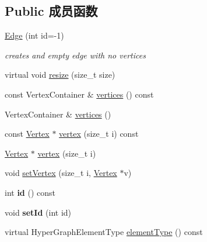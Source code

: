\subsection*{Public 成员函数}
\begin{DoxyCompactItemize}
\item 
\hypertarget{classg2o_1_1HyperGraph_1_1Edge_a891618b34652837ef0bee7084db81f2e}{\hyperlink{classg2o_1_1HyperGraph_1_1Edge_a891618b34652837ef0bee7084db81f2e}{Edge} (int id=-\/1)}\label{classg2o_1_1HyperGraph_1_1Edge_a891618b34652837ef0bee7084db81f2e}

\begin{DoxyCompactList}\small\item\em creates and empty edge with no vertices \end{DoxyCompactList}\item 
virtual void \hyperlink{classg2o_1_1HyperGraph_1_1Edge_ad8913f1149a0fd5bb628f0f1c8a91a55}{resize} (size\-\_\-t size)
\item 
const Vertex\-Container \& \hyperlink{classg2o_1_1HyperGraph_1_1Edge_a6410bb70a917b5407770ef1f1090b5f5}{vertices} () const 
\item 
Vertex\-Container \& \hyperlink{classg2o_1_1HyperGraph_1_1Edge_a67d1c5cb557deab9e9e361c63359fe60}{vertices} ()
\item 
const \hyperlink{classg2o_1_1HyperGraph_1_1Vertex}{Vertex} $\ast$ \hyperlink{classg2o_1_1HyperGraph_1_1Edge_aaec0b2c92c5496d0f0fea8f1abdc4311}{vertex} (size\-\_\-t i) const 
\item 
\hyperlink{classg2o_1_1HyperGraph_1_1Vertex}{Vertex} $\ast$ \hyperlink{classg2o_1_1HyperGraph_1_1Edge_af544d5d17d900c5aa2b5c9219d8e716f}{vertex} (size\-\_\-t i)
\item 
void \hyperlink{classg2o_1_1HyperGraph_1_1Edge_a5e957658d6e65c49b81197d052a7f16f}{set\-Vertex} (size\-\_\-t i, \hyperlink{classg2o_1_1HyperGraph_1_1Vertex}{Vertex} $\ast$v)
\item 
\hypertarget{classg2o_1_1HyperGraph_1_1Edge_a397a7fb12379b2c48b5e6bc4c6c71fc0}{int {\bfseries id} () const }\label{classg2o_1_1HyperGraph_1_1Edge_a397a7fb12379b2c48b5e6bc4c6c71fc0}

\item 
\hypertarget{classg2o_1_1HyperGraph_1_1Edge_a1270ed91efa5f7a0fc42229356cc23e1}{void {\bfseries set\-Id} (int id)}\label{classg2o_1_1HyperGraph_1_1Edge_a1270ed91efa5f7a0fc42229356cc23e1}

\item 
virtual Hyper\-Graph\-Element\-Type \hyperlink{classg2o_1_1HyperGraph_1_1Edge_a73df6169b3669d48f86eef90de0fcc26}{element\-Type} () const 
\end{DoxyCompactItemize}

